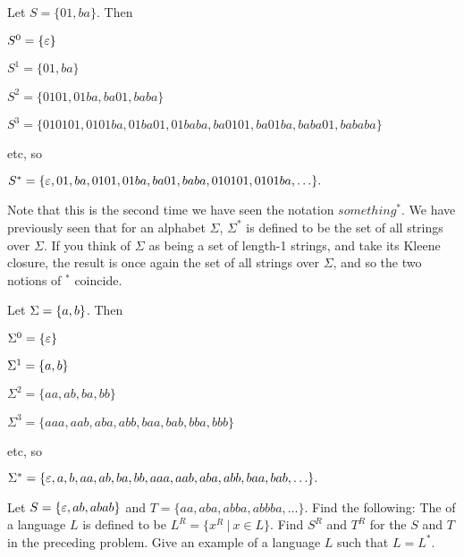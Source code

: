 \begin{example}
Let $S = \{01, ba\}$.  Then

$S^0 = \{\varepsilon\}$

$S^1 = \{01, ba\}$

$S^2 = \{0101, 01ba, ba01, baba\}$

$S^3 = \{010101, 0101ba, 01ba01, 01baba, ba0101, ba01ba, baba01, bababa\}$

etc, so

$S^* =\{\varepsilon,01,ba,0101,01ba,ba01,baba,010101,0101ba,\ldots\}.$
\end{example}
 
\smallskip

Note that this is the second time we have seen the notation $something^*$.  We
have previously seen that for an alphabet $\Sigma$, $\Sigma^*$ is defined to be 
the set of all
strings over $\Sigma$.  If you think of $\Sigma$ as being a set of length-1
strings, and take its Kleene closure, the result is once again the set of all
strings over $\Sigma$, and so the two notions of $^*$ coincide.

\smallskip

\begin{example}
Let $\Sigma = \mbox{$\{a,b\}$}$.  Then

$\Sigma^0 = \{\varepsilon\}$

$\Sigma^1 = \mbox{$\{a,b\}$}$

$\Sigma^2 = \{aa, ab, ba, bb\}$

$\Sigma^3 = \{aaa, aab, aba, abb, baa, bab, bba, bbb\}$

etc, so

$\Sigma^* =\{\varepsilon,a,b,aa,ab,ba,bb,aaa,aab,aba,abb,baa,bab,\ldots\}.$
\end{example}

\begin{exercises}
\problem Let $S = \{\varepsilon, ab, abab\}$ and $T = \{aa, aba, abba, abbba,
\ldots\}$.  Find the following:
\problem The  of a language $L$ is defined to be 
$L^R = \{ x^R \ | \ x \in L\}$.  Find $S^R$ and $T^R$ for the $S$ and $T$ in the
preceding problem.
\problem Give an example of a language $L$ such that $L=L^*$.

\end{exercises}



